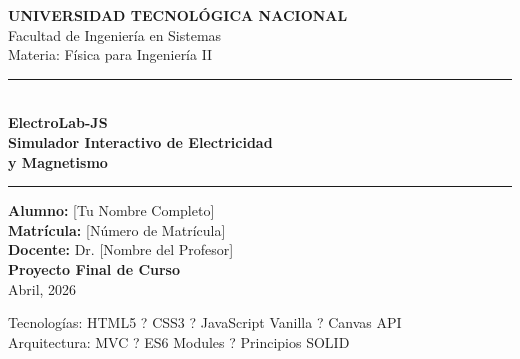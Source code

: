 \documentclass[12pt, a4paper]{article}
\begin{document}
\begin{titlepage}
  \centering
  \vspace*{1.5cm}

  {\Large\bfseries\color{azulprimario} UNIVERSIDAD TECNOLÓGICA NACIONAL}\\[0.3cm]
  {\large\color{gray} Facultad de Ingeniería en Sistemas}\\[0.15cm]
  {\normalsize\color{gray} Materia: Física para Ingeniería II}

  \vspace{1.5cm}
  \textcolor{azulsecundario}{\rule{\linewidth}{2pt}}\\[0.4cm]

  {\Huge\bfseries\color{azulprimario} ElectroLab-JS}\\[0.4cm]
  {\LARGE\bfseries\color{azulsecundario}
    Simulador Interactivo de Electricidad\\[0.2cm] y Magnetismo}\\[0.4cm]

  \textcolor{azulsecundario}{\rule{\linewidth}{2pt}}

  \vspace{1.2cm}

  \begin{tcolorbox}[
    colback=grisclaro, colframe=azulsecundario,
    width=0.7\linewidth, halign=center
  ]
    \centering
    \small
    \textbf{Alumno:} [Tu Nombre Completo]\\
    \textbf{Matrícula:} [Número de Matrícula]\\[6pt]
    \textbf{Docente:} Dr. [Nombre del Profesor]\\[6pt]
    \textbf{Proyecto Final de Curso}\\
    Abril, 2026
  \end{tcolorbox}

  \vfill
  {\footnotesize\color{gray}
    Tecnologías: HTML5 ? CSS3 ? JavaScript Vanilla ? Canvas API\\
    Arquitectura: MVC ? ES6 Modules ? Principios SOLID
  }
\end{titlepage}

\tableofcontents
\newpage
\end{document}
